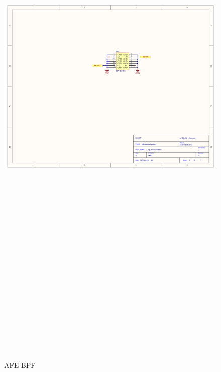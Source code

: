 \begin{landscape}
	\begin{figure}[htbp]
		\centering
		\includegraphics[width=20cm,height=28.7cm,keepaspectratio]{Figures/appendix/afe_altium/3_bpf.pdf}
		\caption{AFE BPF}
		\label{fig:appendix_3_bpf}
	\end{figure}
\end{landscape}

